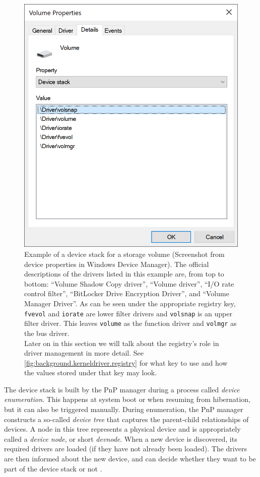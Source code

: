 \begin{figure}[htb!]
	\center
	\includegraphics[scale=0.7]{../img/background.kerneldriver.devicestack.png}
	\caption[
		Example of a device stack for a storage volume
	]{
		Example of a device stack for a storage volume (Screenshot from device properties in Windows Device Manager). The official descriptions of the drivers listed in this example are, from top to bottom: ``Volume Shadow Copy driver'', ``Volume driver'', ``I/O rate control filter'', ``BitLocker Drive Encryption Driver'', and ``Volume Manager Driver''. As can be seen under the appropriate registry key, \texttt{fvevol} and \texttt{iorate} are lower filter drivers and \texttt{volsnap} is an upper filter driver. This leaves \texttt{volume} as the function driver and \texttt{volmgr} as the bus driver.\\
		Later on in this section we will talk about the registry's role in driver management in more detail. See \autoref{fig:background.kerneldriver.registry} for what key to use and how the values stored under that key may look.
	}
	\label{fig:background.kerneldriver.devicestack}
\end{figure}

The device stack is built by the PnP manager during a process called \emph{device enumeration}. This happens at system boot or when resuming from hibernation, but it can also be triggered manually. During enumeration, the PnP manager constructs a so-called \emph{device tree} that captures the parent-child relationships of devices. A node in this tree represents a physical device and is appropriately called a \emph{device node}, or short \emph{devnode}. When a new device is discovered, its required drivers are loaded (if they have not already been loaded). The drivers are then informed about the new device, and can decide whether they want to be part of the device stack or not \cite{Yosifovich2017}.

